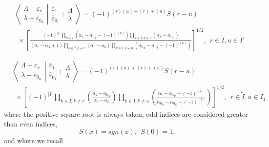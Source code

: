 \documentclass[12pt]{article}
\def\nn{\nonumber}
\begin{document}
\begin{align}
&\left\langle\left. 
\begin{array}{c} \Lambda-\varepsilon_r\\ \lambda-\varepsilon_{0_u} 
 \end{array}
\right|\right.
\left.
\begin{array}{c} \bar{\varepsilon}_1 \\ \bar{\varepsilon}_{0_1} 
 \end{array}
; \begin{array}{c} \Lambda \\ \lambda
 \end{array}
\right\rangle
= (-1)^{(r)(u) +(r) + (u)} S(r-u)
\nn \\
&~~\times
\left[
\frac{
(-1)^{|I|}
\prod_{k\in I} \left(\alpha_r - {\alpha_0}_k - (-1)^{(k)}\right)
\prod_{k\in\tilde{I},k \neq r} \left(\alpha_k - {\alpha_0}_u \right)
}
{
({\alpha}_r-{\alpha}_u + 1)
\prod_{k\in \tilde{I},k\neq r} \left(\alpha_r - \alpha_k \right)
\prod_{k\in I,k\neq u} \left({\alpha_0}_u - {\alpha_0}_k - (-1)^{(k)}\right)
} 
\right]^{1/2}
,\ \ r\in \tilde{I},u\in I' \label{FinalUnBarredEven}
\end{align}

\begin{align}
&\left\langle\left. 
\begin{array}{c} \Lambda-\varepsilon_r\\ \lambda-\varepsilon_{0_u} 
 \end{array}
\right|\right.
\left.
\begin{array}{c} \bar{\varepsilon}_1 \\ \bar{\varepsilon}_{0_1} 
 \end{array}
; \begin{array}{c} \Lambda \\ \lambda
 \end{array}
\right\rangle = (-1)^{(r)(u) +(r) + (u)} S(r-u) 
\nn\\
&~~\times
\left[
 (-1)^{|I|} \prod_{k\in \tilde{I},k\neq r} 
\left(
\frac 
{\alpha_k - {\alpha_0}_u  }
{\alpha_r - \alpha_k }
\right)
\prod_{k\in I,k \neq u} 
\left(
\frac
{ \alpha_r - {\alpha_0}_k - (-1)^{(k)} }
{{\alpha_0}_u - {\alpha_0}_k - (-1)^{(k)} }
\right)
\right]^{1/2}
,\ \ r\in \tilde{I},u\in I_1  \label{FinalUnBarredOdd}
\end{align}
where the positive square root is always taken, odd indices are considered greater than even indices, 
$$
S(x) = sgn(x),~~S(0)=1.
$$
and where we recall
\end{document}
